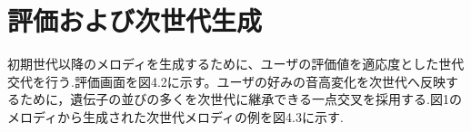 \section{評価および次世代生成}
初期世代以降のメロディを生成するために、ユーザの評価値を適応度とした世代交代を行う.評価画面を図4.2に示す。ユーザの好みの音高変化を次世代へ反映するために，遺伝子の並びの多くを次世代に継承できる一点交叉を採用する.図1のメロディから生成された次世代メロディの例を図4.3に示す.



